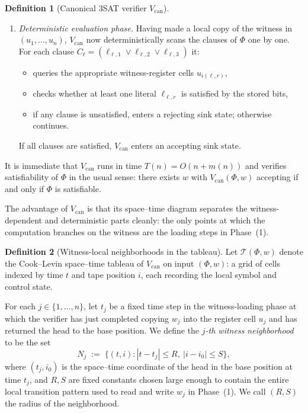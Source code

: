 \documentclass[12pt]{article}
\theoremstyle{definition}
\newtheorem{definition}{Definition}
\theoremstyle{definition}
\theoremstyle{remark}
\theoremstyle{remark}
\begin{document}
\begin{definition}[Canonical 3SAT verifier $V_{\mathrm{can}}$]
\begin{enumerate}[label=(\arabic*)]
  \item \emph{Deterministic evaluation phase.} Having made a local copy of the
  witness in $(u_1,\dots,u_n)$, $V_{\mathrm{can}}$ now deterministically scans
  the clauses of $\Phi$ one by one. For each clause
  $C_\ell = (\ell_{\ell,1} \vee \ell_{\ell,2} \vee \ell_{\ell,3})$ it:
  \begin{itemize}
    \item queries the appropriate witness-register cells $u_{i(\ell,r)}$,
    \item checks whether at least one literal $\ell_{\ell,r}$ is satisfied by
          the stored bits,
    \item if any clause is unsatisfied, enters a rejecting sink state;
          otherwise continues.
  \end{itemize}
  If all clauses are satisfied, $V_{\mathrm{can}}$ enters an accepting sink
  state.
\end{enumerate}
It is immediate that $V_{\mathrm{can}}$ runs in time $T(n) = O(n + m(n))$ and
verifies satisfiability of $\Phi$ in the usual sense: there exists $w$ with
$V_{\mathrm{can}}(\Phi,w)$ accepting if and only if $\Phi$ is satisfiable.
\end{definition}

The advantage of $V_{\mathrm{can}}$ is that its space--time diagram separates
the witness-dependent and deterministic parts cleanly: the only points at which
the computation branches on the witness are the loading steps in Phase~(1).

\begin{definition}[Witness-local neighborhoods in the tableau]
\label{def:witness-neighborhoods}
Let $\mathcal{T}(\Phi,w)$ denote the Cook--Levin space--time tableau of
$V_{\mathrm{can}}$ on input $(\Phi,w)$: a grid of cells indexed by time $t$
and tape position $i$, each recording the local symbol and control state.

For each $j \in \{1,\dots,n\}$, let $t_j$ be a fixed time step in the
witness-loading phase at which the verifier has just completed copying $w_j$
into the register cell $u_j$ and has returned the head to the base position.
We define the \emph{$j$-th witness neighborhood} to be the set
\[
   N_j \;:=\; \{(t,i) : |t - t_j| \le R,\ |i - i_0| \le S\},
\]
where $(t_j,i_0)$ is the space--time coordinate of the head in the base
position at time $t_j$, and $R,S$ are fixed constants chosen large enough to
contain the entire local transition pattern used to read and write $w_j$ in
Phase~(1). We call $(R,S)$ the radius of the neighborhood.
\end{definition}
\end{document}
